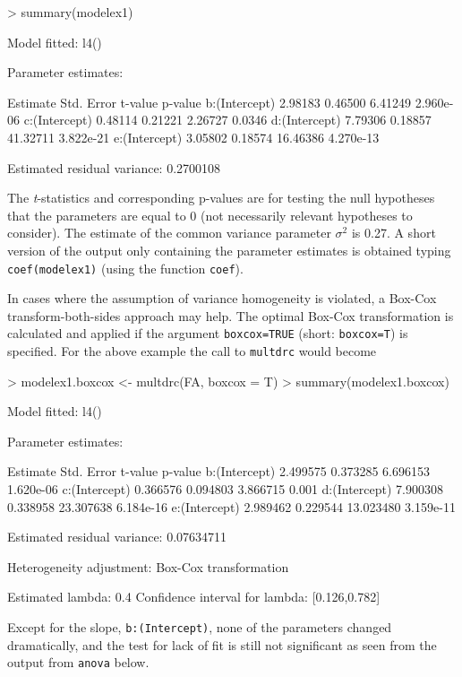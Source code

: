 \documentclass[a4paper]{article}
\begin{document}
\begin{Schunk}
\begin{Sinput}
> summary(modelex1)
\end{Sinput}
\begin{Soutput}
Model fitted: l4()

Parameter estimates:

              Estimate Std. Error  t-value   p-value
b:(Intercept)  2.98183    0.46500  6.41249 2.960e-06
c:(Intercept)  0.48114    0.21221  2.26727    0.0346
d:(Intercept)  7.79306    0.18857 41.32711 3.822e-21
e:(Intercept)  3.05802    0.18574 16.46386 4.270e-13

Estimated residual variance: 0.2700108 
\end{Soutput}
\end{Schunk}
The \emph{t}-statistics and corresponding p-values are for testing the null hypotheses that the parameters are equal to 0 (not
necessarily relevant hypotheses to consider). The estimate of the common variance parameter $\sigma^2$ is 
0.27.
A short version of the output only containing the parameter estimates is obtained typing \verb+coef(modelex1)+ (using the function \verb+coef+).



In cases where the assumption of variance homogeneity is violated, a Box-Cox transform-both-sides approach may help. The optimal
Box-Cox transformation is calculated and applied if the argument \verb+boxcox=TRUE+ (short: \verb+boxcox=T+) is specified. For the
above example the call to \verb+multdrc+ would become

\begin{Schunk}
\begin{Sinput}
> modelex1.boxcox <- multdrc(FA, boxcox = T)
> summary(modelex1.boxcox)
\end{Sinput}
\begin{Soutput}
Model fitted: l4()

Parameter estimates:

               Estimate Std. Error   t-value   p-value
b:(Intercept)  2.499575   0.373285  6.696153 1.620e-06
c:(Intercept)  0.366576   0.094803  3.866715     0.001
d:(Intercept)  7.900308   0.338958 23.307638 6.184e-16
e:(Intercept)  2.989462   0.229544 13.023480 3.159e-11

Estimated residual variance: 0.07634711 

Heterogeneity adjustment: Box-Cox transformation

Estimated lambda: 0.4 
Confidence interval for lambda: [0.126,0.782] 
\end{Soutput}
\end{Schunk}
Except for the slope, \verb+b:(Intercept)+, none of the parameters changed dramatically, and the test for lack of fit is still not significant as seen from the
output from \verb+anova+ below.
\end{document}
